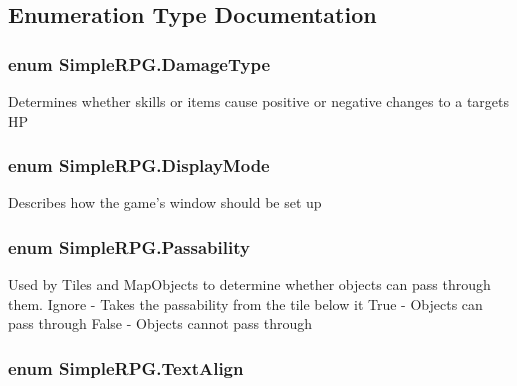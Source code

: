 \subsection{Enumeration Type Documentation}
\hypertarget{namespace_simple_r_p_g_aa7bf94f037fcccbe428edca5e36bec67}{
\subsubsection[{Damage\-Type}]{\setlength{\rightskip}{0pt plus 5cm}enum {\bf Simple\-R\-P\-G.\-Damage\-Type}}}\label{namespace_simple_r_p_g_aa7bf94f037fcccbe428edca5e36bec67}


Determines whether skills or items cause positive or negative changes to a targets H\-P 

\hypertarget{namespace_simple_r_p_g_a52ff6b4f812beca5f07344ae6652c1b4}{
\subsubsection[{Display\-Mode}]{\setlength{\rightskip}{0pt plus 5cm}enum {\bf Simple\-R\-P\-G.\-Display\-Mode}}}\label{namespace_simple_r_p_g_a52ff6b4f812beca5f07344ae6652c1b4}


Describes how the game's window should be set up 

\hypertarget{namespace_simple_r_p_g_a5f1ec21e7f4e36278a6cedd38c51e650}{
\subsubsection[{Passability}]{\setlength{\rightskip}{0pt plus 5cm}enum {\bf Simple\-R\-P\-G.\-Passability}}}\label{namespace_simple_r_p_g_a5f1ec21e7f4e36278a6cedd38c51e650}


Used by Tiles and Map\-Objects to determine whether objects can pass through them. Ignore -\/ Takes the passability from the tile below it True -\/ Objects can pass through False -\/ Objects cannot pass through 

\hypertarget{namespace_simple_r_p_g_a956c6a011833191ccb1b0aa38a1d5916}{
\subsubsection[{Text\-Align}]{\setlength{\rightskip}{0pt plus 5cm}enum {\bf Simple\-R\-P\-G.\-Text\-Align}}}\label{namespace_simple_r_p_g_a956c6a011833191ccb1b0aa38a1d5916}


